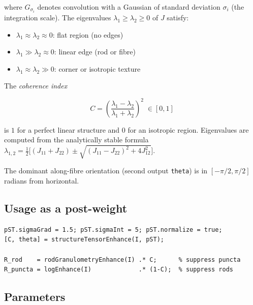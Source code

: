 \documentclass[a4paper, justified]{tufte-book}
\begin{document}
where $G_{\sigma_i}$ denotes convolution with a Gaussian of standard deviation
$\sigma_i$ (the integration scale).  The eigenvalues $\lambda_1 \geq \lambda_2
\geq 0$ of $J$ satisfy:
\begin{itemize}
  \item $\lambda_1 \approx \lambda_2 \approx 0$: flat region (no edges)
  \item $\lambda_1 \gg \lambda_2 \approx 0$: linear edge (rod or fibre)
  \item $\lambda_1 \approx \lambda_2 \gg 0$: corner or isotropic texture
\end{itemize}

The \emph{coherence index}

\begin{equation}
  C = \left(\frac{\lambda_1 - \lambda_2}{\lambda_1 + \lambda_2}\right)^2
  \;\in [0, 1]
\end{equation}

is $1$ for a perfect linear structure and $0$ for an isotropic region.
Eigenvalues are computed from the analytically stable formula
$\lambda_{1,2} = \tfrac{1}{2}\bigl[(J_{11}+J_{22}) \pm
\sqrt{(J_{11}-J_{22})^2 + 4J_{12}^2}\bigr]$.

The dominant along-fibre orientation (second output \texttt{theta}) is in
$[-\pi/2, \pi/2]$ radians from horizontal.

\subsection*{Usage as a post-weight}

\begin{lstlisting}
pST.sigmaGrad = 1.5; pST.sigmaInt = 5; pST.normalize = true;
[C, theta] = structureTensorEnhance(I, pST);

R_rod    = rodGranulometryEnhance(I) .* C;      % suppress puncta
R_puncta = logEnhance(I)             .* (1-C);  % suppress rods
\end{lstlisting}

\subsection*{Parameters}
\end{document}
